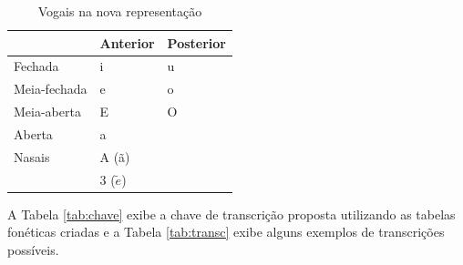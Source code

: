 \begin{center}
\begin{table}[H]
\begin{center}
    \begin{tabular}{lll}
        \hline
         & Anterior & Posterior \\
         \hline
        Fechada & i & u \\
        \hline
        Meia-fechada & e & o \\
        \hline
        Meia-aberta & E & O \\
        \hline
        Aberta & a &  \\
        \hline
        Nasais & A (ã) &\\ & 3 ($\tilde{e}$) &\\ 
        \hline
    \end{tabular}
\end{center}
\caption{Vogais na nova representação}
\label{tab:new_vocals}
\end{table}
\end{center}


 A Tabela \ref{tab:chave} exibe a chave de transcrição proposta utilizando as tabelas  fonéticas criadas e a Tabela \ref{tab:transc} exibe alguns exemplos de transcrições possíveis.  

